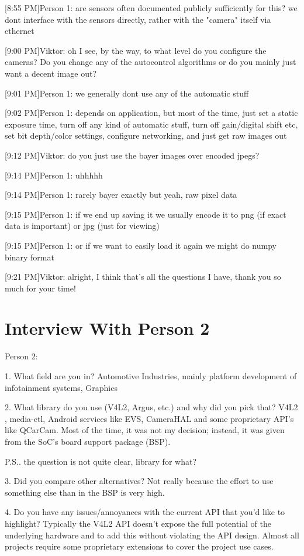 [8:55 PM]Person 1:
are sensors often documented publicly sufficiently for this?
we dont interface with the sensors directly, rather with the "camera" itself via ethernet

[9:00 PM]Viktor: oh I see, by the way, to what level do you configure the cameras? Do you change any of the autocontrol algorithms or do you mainly just want a decent image out?

[9:01 PM]Person 1: we generally dont use any of the automatic stuff

[9:02 PM]Person 1: depends on application, but most of the time, just set a static exposure time, turn off any kind of automatic stuff, turn off gain/digital shift etc, set bit depth/color settings, configure networking, and just get raw images out

[9:12 PM]Viktor: do you just use the bayer images over encoded jpegs?

[9:14 PM]Person 1: uhhhhh

[9:14 PM]Person 1: rarely bayer exactly but yeah, raw pixel data

[9:15 PM]Person 1: if we end up saving it we usually encode it to png (if exact data is important) or jpg (just for viewing)

[9:15 PM]Person 1: or if we want to easily load it again we might do numpy binary format

[9:21 PM]Viktor: alright, I think that's all the questions I have, thank you so much for your time!

\section{Interview With Person 2}
Person 2:

1. What field are you in?
Automotive Industries, mainly platform development of infotainment systems, Graphics

2. What library do you use (V4L2, Argus, etc.) and why did you pick that?
V4L2 , media-ctl, Android services like EVS, CameraHAL and some proprietary API's like  QCarCam.
Most of the time, it was not my decision; instead, it was given from the SoC's board support package (BSP).

P.S.. the question is not quite clear, library for what?

3. Did you compare other alternatives?
Not really because the effort to use something else than in the BSP is very high.

4. Do you have any issues/annoyances with the current API that you’d like to highlight?
Typically the V4L2 API doesn't expose the full potential of the underlying hardware and to add this without violating the API design. Almost all projects require some proprietary extensions to cover the project use cases.

